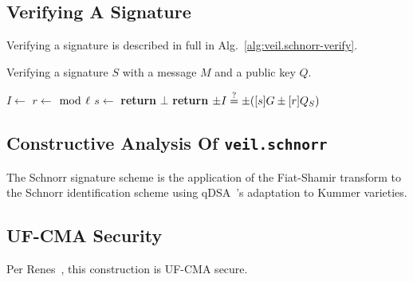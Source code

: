\subsection{Verifying A Signature}\label{subsec:veil.schnorr-verify}

Verifying a signature is described in full in Alg.~\ref{alg:veil.schnorr-verify}.

\begin{algorithm}[!htp]
    \caption{
        Verifying a signature $S$ with a message $M$ and a public key $Q$.
    }
    \begin{algorithmic}
            \State {}
            \State {}
            \State {}
            \State
            \State {}
            \State
            \State $I \gets $ 
            \State $r \gets$  $\bmod~\ell$
            \State $s \gets $ 
                \State \textbf{return} $\bot$
            \EndIf
            \State
            \State \textbf{return} $\pm I \stackrel{?}{=} \pm ([s]G \pm [r]Q_S)$
        \EndFunction
    \end{algorithmic}
    \label{alg:veil.schnorr-verify}
\end{algorithm}

\subsection{Constructive Analysis Of \texttt{veil.schnorr}}\label{subsec:veil.schnorr-analysis}

The Schnorr signature scheme is the application of the Fiat-Shamir transform to the Schnorr identification scheme using
qDSA~\cite{renes2017}'s adaptation to Kummer varieties.

\subsection{UF-CMA Security}\label{subsec:veil.schnorr-uf-cma}

Per Renes~\cite{renes2017}, this construction is UF-CMA secure.

